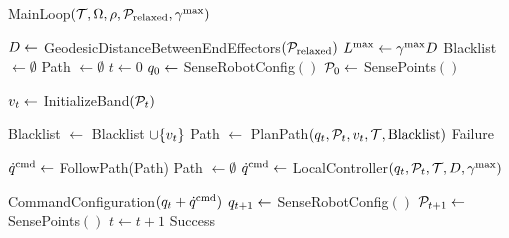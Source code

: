 \begin{algorithm}[t]
\caption{MainLoop$(\mathcal{T}, \Omega, \rho, \mathcal{P}_\textrm{relaxed}, \gamma^{\textrm{max}})$}
\begin{algorithmic}[1]
    \State $D \gets$ GeodesicDistanceBetweenEndEffectors$(\mathcal{P}_\textrm{relaxed})$
    \State $L^\textrm{max} \gets \gamma^{\textrm{max}} D$
    \State Blacklist $\gets \emptyset$
    \State Path $\gets \emptyset$
    \State $t \gets 0$
    \State $q_0 \gets$ SenseRobotConfig$()$
    \State $\mathcal{P}_0 \gets$ SensePoints$()$
    
        \State $v_t \gets$ InitializeBand$(\mathcal{P}_t)$
        
            \State Blacklist $\gets$ Blacklist $\cup \{ v_t \}$
            \State Path $\gets$ PlanPath$(q_t, \mathcal{P}_t, v_t, \mathcal{T}, \textrm{Blacklist})$
                \State \Return Failure
            \EndIf
        \EndIf
        
            \State $\dot{q}^{\textrm{cmd}} \gets$ FollowPath(Path)
                \State Path $\gets \emptyset$
            \EndIf
        \Else
            \State $\dot{q}^{\textrm{cmd}} \gets$ LocalController$(q_t, \mathcal{P}_t, \mathcal{T}, D, \gamma^{\textrm{max}})$
        \EndIf
        
        \State CommandConfiguration$(q_t + \dot{q}^{\textrm{cmd}})$
        \State $q_{t+1} \gets$ SenseRobotConfig$()$
        \State $\mathcal{P}_{t+1} \gets$ SensePoints$()$
        \State $t \gets t + 1$
    \EndWhile
    \State \Return Success
\end{algorithmic}
\label{alg:interleaving_mainloop}
\end{algorithm}
